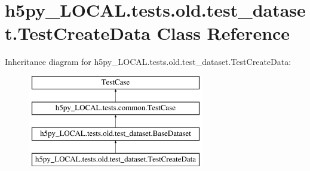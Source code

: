 \hypertarget{classh5py__LOCAL_1_1tests_1_1old_1_1test__dataset_1_1TestCreateData}{}\section{h5py\+\_\+\+L\+O\+C\+A\+L.\+tests.\+old.\+test\+\_\+dataset.\+Test\+Create\+Data Class Reference}
\label{classh5py__LOCAL_1_1tests_1_1old_1_1test__dataset_1_1TestCreateData}
Inheritance diagram for h5py\+\_\+\+L\+O\+C\+A\+L.\+tests.\+old.\+test\+\_\+dataset.\+Test\+Create\+Data\+:\begin{figure}[H]
\begin{center}
\leavevmode
\includegraphics[height=4.000000cm]{classh5py__LOCAL_1_1tests_1_1old_1_1test__dataset_1_1TestCreateData}
\end{center}
\end{figure}
